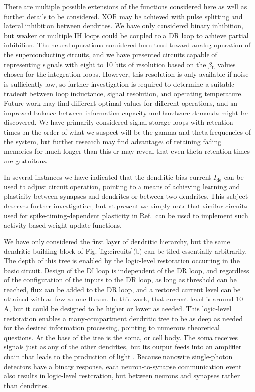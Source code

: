 \documentclass[twocolumn]{article}
\newcommand{\onlinecite}[1]{\hspace{-1 ex} \nocite{#1}\citenum{#1}}
\begin{document}
There are multiple possible extensions of the functions considered here as well as further details to be considered. XOR may be achieved with pulse splitting and lateral inhibition between dendrites. We have only considered binary inhibition, but weaker or multiple IH loops could be coupled to a DR loop to achieve partial inhibition. The neural operations considered here tend toward analog operation of the superconducting circuits, and we have presented circuits capable of representing signals with eight to 10 bits of resolution based on the $\beta_{\mathrm{L}}$ values chosen for the integration loops. However, this resolution is only available if noise is sufficiently low, so further investigation is required to determine a suitable tradeoff between loop inductance, signal resolution, and operating temperature. Future work may find different optimal values for different operations, and an improved balance between information capacity and hardware demands might be discovered. We have primarily considered signal storage loops with retention times on the order of what we suspect will be the gamma and theta frequencies of the system, but further research may find advantages of retaining fading memories for much longer than this or may reveal that even theta retention times are gratuitous. 

In several instances we have indicated that the dendritic bias current $I_{\mathrm{de}}$ can be used to adjust circuit operation, pointing to a means of achieving learning and plasticity between synapses and dendrites \cite{haah2015} or between two dendrites. This subject deserves further investigation, but at present we simply note that similar circuits used for spike-timing-dependent plasticity in Ref.\,\onlinecite{sh2018_full} can be used to implement such activity-based weight update functions. 

We have only considered the first layer of dendritic hierarchy, but the same dendritic building block of Fig.\,\ref{fig:circuits}(b) can be tiled essentially arbitrarily. The depth of this tree is enabled by the logic-level restoration occurring in the basic circuit. Design of the DI loop is independent of the DR loop, and regardless of the configuration of the inputs to the DR loop, as long as threshold can be reached, flux can be added to the DR loop, and a restored current level can be attained with as few as one fluxon. In this work, that current level is around 10\,\textmu A, but it could be designed to be higher or lower as needed. This logic-level restoration enables a many-compartment dendritic tree to be as deep as needed for the desired information processing, pointing to numerous theoretical questions. At the base of the tree is the soma, or cell body. The soma receives signals just as any of the other dendrites, but its output feeds into an amplifier chain that leads to the production of light \cite{sh2018_full}. Because nanowire single-photon detectors have a binary response, each neuron-to-synapse communication event also results in logic-level restoration, but between neurons and synapses rather than dendrites.
\end{document}
